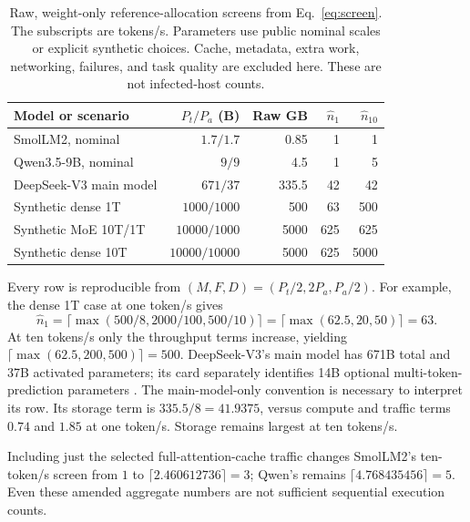 \documentclass[11pt]{article}
\begin{document}
\begin{table}[ht]
\centering\small
\begin{tabular}{lrrrr}
\toprule Model or scenario & $P_t/P_a$ (B) & Raw GB & $\widehat n_1$ & $\widehat n_{10}$\\\midrule
SmolLM2, nominal & $1.7/1.7$ & 0.85 & 1 & 1\\
Qwen3.5-9B, nominal & $9/9$ & 4.5 & 1 & 5\\
DeepSeek-V3 main model & $671/37$ & 335.5 & 42 & 42\\
Synthetic dense 1T & $1000/1000$ & 500 & 63 & 500\\
Synthetic MoE 10T/1T & $10000/1000$ & 5000 & 625 & 625\\
Synthetic dense 10T & $10000/10000$ & 5000 & 625 & 5000\\\bottomrule
\end{tabular}
\caption{Raw, weight-only reference-allocation screens from Eq.~\eqref{eq:screen}. The subscripts are tokens/s. Parameters use public nominal scales \citep{smol,qwen,deepseek} or explicit synthetic choices. Cache, metadata, extra work, networking, failures, and task quality are excluded here. These are not infected-host counts.}
\label{tab:screen}
\end{table}

Every row is reproducible from $(M,F,D)=(P_t/2,2P_a,P_a/2)$. For example, the dense 1T case at one token/s gives
\begin{equation}
\widehat n_1=\lceil\max(500/8,2000/100,500/10)\rceil
=\lceil\max(62.5,20,50)\rceil=63.
\end{equation}
At ten tokens/s only the throughput terms increase, yielding $\lceil\max(62.5,200,500)\rceil=500$. DeepSeek-V3's main model has 671B total and 37B activated parameters; its card separately identifies 14B optional multi-token-prediction parameters \citep{deepseek}. The main-model-only convention is necessary to interpret its row. Its storage term is $335.5/8=41.9375$, versus compute and traffic terms $0.74$ and $1.85$ at one token/s. Storage remains largest at ten tokens/s.

Including just the selected full-attention-cache traffic changes SmolLM2's ten-token/s screen from $1$ to $\lceil2.460612736\rceil=3$; Qwen's remains $\lceil4.768435456\rceil=5$. Even these amended aggregate numbers are not sufficient sequential execution counts.
\end{document}
